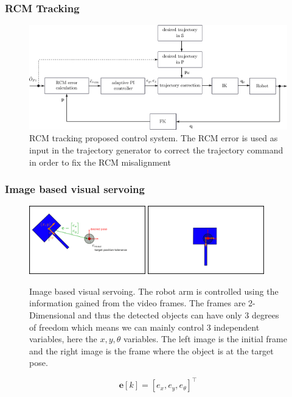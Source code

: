 \begin{frame}
\frametitle{RCM Tracking}
\begin{center}
\begin{figure}[!htb]
\centering
\includegraphics[width=\textwidth]{../images/rcm-system-control.png}
\caption{RCM tracking proposed control system. The RCM error is used as input in the trajectory generator to correct the trajectory command in order to fix the RCM misalignment}
\label{rcm-control-system-block-diagram}
\end{figure}
\end{center}
\end{frame}


\begin{frame}
\frametitle{Image based visual servoing}
\begin{center}
\begin{figure}[!htb]
\centering
\includegraphics[width=0.45\textwidth]{../images/visual_servo_start.png}
\includegraphics[width=0.45\textwidth]{../images/visual_servo_end.png}\\
\caption{Image based visual servoing. The robot arm is controlled using the information gained from the video frames. The frames are 2-Dimensional and thus 
the detected objects can have only 3 degrees of freedom which means we can mainly control 3 independent variables, here the $x,y,θ$ variables. The left image 
is the initial frame and the right image is the frame where the object is at the target pose.}
\label{image-based-servoing-start-end}
\end{figure}

\[
\mathbf{e}[k] = [e_x, e_y, e_θ]^\top
\]
\end{center}
\end{frame}

